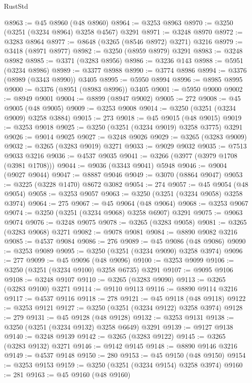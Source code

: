 \begin{lexlean}{RustStd}
\begin{coremodule}
@8963 := @45 @8960 (@48 @8960)
@8964 := @3253 @8963
@8970 := @3250 (@3251 (@3234 @8964) @3258 @4567) @3291
@8971 := @3248 @8970
@8972 := @3283 @8964
@8977 := @8648 (@3265 (@8546 @8972) @3271) @3216
@8979 := @3418 (@8971 @8977)
@8982 := @3250 (@8959 @8979) @3291
@8983 := @3248 @8982
@8985 := @3371 (@3283 @8956)
@8986 := @3236 @143
@8988 := @5951 (@3234 @8986)
@8989 := @3377 @8988
@8990 := @3774 @8986
@8994 := @3376 (@8989 (@3343 @8990)) @3405
@8995 := @5950 @8994
@8996 := @8985 @8995
@9000 := @3376 (@8951 (@8983 @8996)) @3405
@9001 := @5950 @9000
@9002 := @8949 @9001
@9004 := @8899 (@8947 @9002)
@9005 := 272
@9008 := @45 @9005 (@48 @9005)
@9009 := @3253 @9008
@9014 := @3250 (@3251 (@3234 @9009) @3258 @3884)
@9015 := 273
@9018 := @45 @9015 (@48 @9015)
@9019 := @3253 @9018
@9025 := @3250 (@3251 (@3234 @9019) @3258 @3775) @3291
@9026 := @9014 @9025
@9027 := @3248 @9026
@9029 := @3265 (@3283 @9009)
@9032 := @3265 (@3283 @9019) @3271
@9033 := @9029 @9032
@9035 := @7513 @9033 @3216
@9036 := @4537 @9035
@9041 := @3266 (@3977 (@3979 @1708 (@3981 @1708)))
@9044 := @9036 (@3343 @9041) @5948
@9046 := @9004 (@9027 @9044)
@9047 := @8887 @9046
@9049 := @3070 (@8864 @9047)
@9053 := @3225 (@3228 @1470) @8672 @3082
@9054 := 274
@9057 := @45 @9054 (@48 @9054)
@9058 := @3253 @9057
@9063 := @3250 (@3251 (@3234 @9058) @3258 @3974)
@9064 := 275
@9067 := @45 @9064 (@48 @9064)
@9068 := @3253 @9067
@9074 := @3250 (@3251 (@3234 @9068) @3258 @6907) @3291
@9075 := @9063 @9074
@9076 := @3248 @9075
@9078 := @3265 (@3283 @9058)
@9081 := @3265 (@3283 @9068) @3271
@9082 := @9078 @9081
@9084 := @8890 @9082 @3216
@9085 := @4537 @9084
@9086 := 276
@9089 := @45 @9086 (@48 @9086)
@9090 := @3253 @9089
@9095 := @3250 (@3251 (@3234 @9090) @3258 @3974)
@9096 := 277
@9099 := @45 @9096 (@48 @9096)
@9100 := @3253 @9099
@9106 := @3250 (@3251 (@3234 @9100) @3258 @6735) @3291
@9107 := @9095 @9106
@9108 := @3248 @9107
@9110 := @3265 (@3283 @9090)
@9113 := @3265 (@3283 @9100) @3271
@9114 := @9110 @9113
@9116 := @8890 @9114 @3216
@9117 := @4537 @9116
@9118 := 278
@9121 := @45 @9118 (@48 @9118)
@9122 := @3253 @9121
@9127 := @3250 (@3251 (@3234 @9122) @3258 @3974)
@9128 := 279
@9131 := @45 @9128 (@48 @9128)
@9132 := @3253 @9131
@9138 := @3250 (@3251 (@3234 @9132) @3258 @6649) @3291
@9139 := @9127 @9138
@9140 := @3248 @9139
@9142 := @3265 (@3283 @9122)
@9145 := @3265 (@3283 @9132) @3271
@9146 := @9142 @9145
@9148 := @8890 @9146 @3216
@9149 := @4537 @9148
@9150 := 280
@9153 := @45 @9150 (@48 @9150)
@9154 := @3253 @9153
@9159 := @3250 (@3251 (@3234 @9154) @3258 @3974)
@9160 := 281
@9163 := @45 @9160 (@48 @9160)

\end{coremodule}
\end{lexlean}
